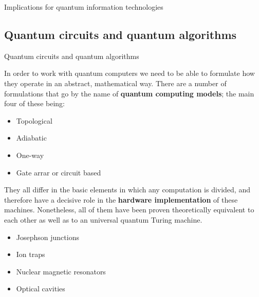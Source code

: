 \documentclass[9pt, handout, aspectratio=169]{beamer}	%
\begin{document}
\begin{frame}{Implications for quantum information technologies}
\begin{multicols}{2}
	\end{multicols}

\end{frame}


\subsection{Quantum circuits and quantum algorithms}

\begin{frame}{Quantum circuits and quantum algorithms}

	In order to work with quantum computers we need to be able to formulate how they operate in an abstract, mathematical way. There are a number of formulations that go by the name of \textbf{quantum computing models}; the main four of these being:

	\begin{multicols}{2}
		\begin{itemize}
			\item Topological
			\item Adiabatic
			\columnbreak
			\item One-way
			\item Gate arrar or circuit based
		\end{itemize}
	\end{multicols}

	\pause

	They all differ in the basic elements in which any computation is divided, and therefore have a decisive role in the \textbf{hardware implementation} of these machines. Nonetheless, all of them have been proven theoretically equivalent to each other as well as to an universal quantum Turing machine.

	\begin{multicols}{2}
		\begin{itemize}
			\item Josephson junctions
			\item Ion traps
			\columnbreak
			\item Nuclear magnetic resonators
			\item Optical cavities
		\end{itemize}
	\end{multicols}

\end{frame}

\end{document}
